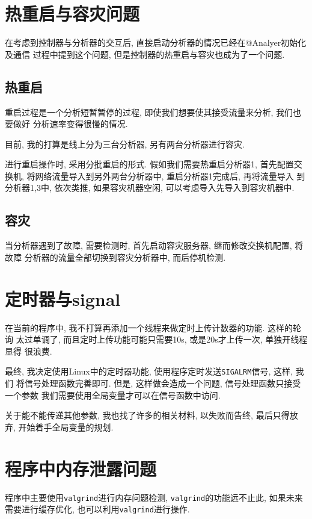 \section{热重启与容灾问题}

在考虑到控制器与分析器的交互后,
直接启动分析器的情况已经在@Analyer初始化及通信 过程中提到这个问题,
但是控制器的热重启与容灾也成为了一个问题.

\subsection{热重启}

重启过程是一个分析短暂暂停的过程, 即使我们想要使其接受流量来分析,
我们也要做好 分析速率变得很慢的情况.

目前, 我的打算是线上分为三台分析器, 另有两台分析器进行容灾.

进行重启操作时, 采用分批重启的形式. 假如我们需要热重启分析器1,
首先配置交换机, 将网络流量导入到另外两台分析器中, 重启分析器1完成后,
再将流量导入 到分析器1,3中, 依次类推, 如果容灾机器空闲,
可以考虑导入先导入到容灾机器中.

\subsection{容灾}

当分析器遇到了故障, 需要检测时, 首先启动容灾服务器, 继而修改交换机配置,
将故障 分析器的流量全部切换到容灾分析器中, 而后停机检测.

\section{定时器与signal}

在当前的程序中, 我不打算再添加一个线程来做定时上传计数器的功能.
这样的轮询 太过单调了, 而且定时上传功能可能只需要10s, 或是20s才上传一次,
单独开线程显得 很浪费.

最终, 我决定使用Linux中的定时器功能,
使用程序定时发送\texttt{SIGALRM}信号, 这样, 我们 将信号处理函数完善即可.
但是, 这样做会造成一个问题, 信号处理函数只接受一个参数
我们需要使用全局变量才可以在信号函数中访问.

关于能不能传递其他参数, 我也找了许多的相关材料, 以失败而告终,
最后只得放弃, 开始着手全局变量的规划.

\section{程序中内存泄露问题}

程序中主要使用\texttt{valgrind}进行内存问题检测,
\texttt{valgrind}的功能远不止此, 如果未来 需要进行缓存优化,
也可以利用\texttt{valgrind}进行操作.

